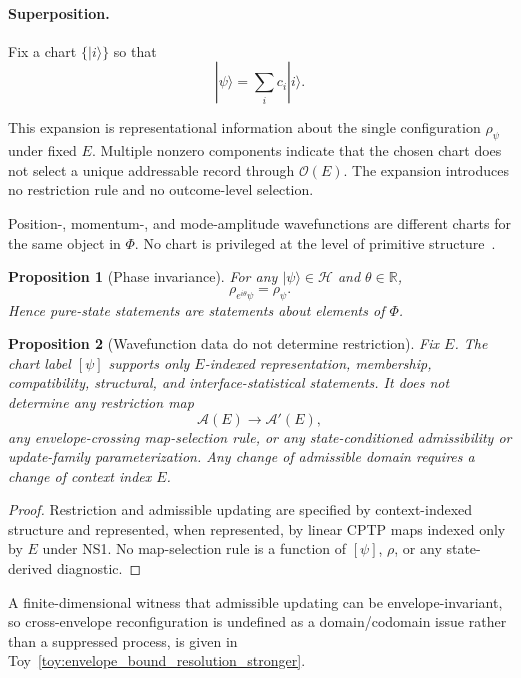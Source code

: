 \documentclass[aps,prx,onecolumn,11pt]{revtex4-2}
\theoremstyle{plain}
\newtheorem{proposition}{Proposition}
\theoremstyle{definition}
\theoremstyle{remark}
\begin{document}
\paragraph{Superposition.}

Fix a chart \(\{|i\rangle\}\) so that
\[
|\psi\rangle
=
\sum_i c_i |i\rangle.
\]

This expansion is representational information about the single
configuration \(\rho_\psi\) under fixed \(E\). Multiple nonzero
components indicate that the chosen chart does not select a unique
addressable record through \(\mathcal O(E)\). The expansion introduces
no restriction rule and no outcome-level selection.

Position-, momentum-, and mode-amplitude wavefunctions are different
charts for the same object in \(\Phi\). No chart is privileged
at the level of primitive structure~\cite{NielsenChuang2010,Watrous2018}.

\begin{proposition}[Phase invariance]
\label{prop:wf_density_equiv}
For any \(|\psi\rangle\in\mathcal H\) and
\(\theta\in\mathbb R\),
\[
\rho_{e^{i\theta}\psi}
=
\rho_\psi.
\]
Hence pure-state statements are statements about elements of \(\Phi\).
\end{proposition}

\begin{proposition}[Wavefunction data do not determine restriction]
\label{prop:wf_no_restriction_map}
Fix \(E\). The chart label \([\psi]\) supports only \(E\)-indexed
representation, membership, compatibility, structural, and
interface-statistical statements. It does not determine any restriction
map
\[
\mathcal A(E)\to\mathcal A'(E),
\]
any envelope-crossing map-selection rule, or any state-conditioned
admissibility or update-family parameterization. Any change of
admissible domain requires a change of context index \(E\).
\end{proposition}

\begin{proof}
Restriction and admissible updating are specified by context-indexed
structure and represented, when represented, by linear CPTP maps
indexed only by \(E\) under NS1. No map-selection rule is a function
of \([\psi]\), \(\rho\), or any state-derived diagnostic.
\end{proof}

A finite-dimensional witness that admissible updating can be
envelope-invariant, so cross-envelope reconfiguration is undefined
as a domain/codomain issue rather than a suppressed process, is
given in Toy~\ref{toy:envelope_bound_resolution_stronger}.
\end{document}
